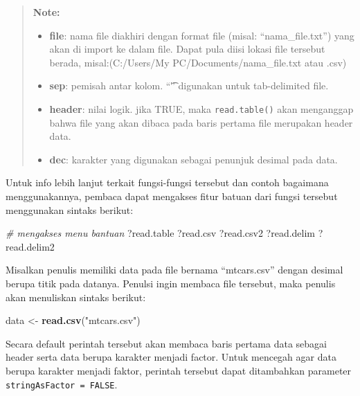 \documentclass[]{book}
\newenvironment{Shaded}{\begin{snugshade}}{\end{snugshade}}
\newcommand{\KeywordTok}[1]{\textcolor[rgb]{0.13,0.29,0.53}{\textbf{#1}}}
\newcommand{\StringTok}[1]{\textcolor[rgb]{0.31,0.60,0.02}{#1}}
\newcommand{\CommentTok}[1]{\textcolor[rgb]{0.56,0.35,0.01}{\textit{#1}}}
\newcommand{\NormalTok}[1]{#1}
\providecommand{\tightlist}{%
  \setlength{\itemsep}{0pt}\setlength{\parskip}{0pt}}
\begin{document}
\begin{quote}
\textbf{Note: }

\begin{itemize}
\tightlist
\item
  \textbf{file}: nama file diakhiri dengan format file (misal:
  ``nama\_file.txt'') yang akan di import ke dalam file. Dapat pula
  diisi lokasi file tersebut berada, misal:(C:/Users/My
  PC/Documents/nama\_file.txt atau .csv)
\item
  \textbf{sep}: pemisah antar kolom. ``\t'' digunakan untuk
  tab-delimited file.
\item
  \textbf{header}: nilai logik. jika TRUE, maka \texttt{read.table()}
  akan menganggap bahwa file yang akan dibaca pada baris pertama file
  merupakan header data.
\item
  \textbf{dec}: karakter yang digunakan sebagai penunjuk desimal pada
  data.
\end{itemize}
\end{quote}

Untuk info lebih lanjut terkait fungsi-fungsi tersebut dan contoh
bagaimana menggunakannya, pembaca dapat mengakses fitur batuan dari
fungsi tersebut menggunakan sintaks berikut:

\begin{Shaded}
\begin{Highlighting}[]
\CommentTok{# mengakses menu bantuan}
\NormalTok{?read.table}
\NormalTok{?read.csv}
\NormalTok{?read.csv2}
\NormalTok{?read.delim}
\NormalTok{?read.delim2}
\end{Highlighting}
\end{Shaded}

Misalkan penulis memiliki data pada file bernama ``mtcars.csv'' dengan
desimal berupa titik pada datanya. Penulsi ingin membaca file tersebut,
maka penulis akan menuliskan sintaks berikut:

\begin{Shaded}
\begin{Highlighting}[]
\NormalTok{data <-}\StringTok{ }\KeywordTok{read.csv}\NormalTok{(}\StringTok{"mtcars.csv"}\NormalTok{)}
\end{Highlighting}
\end{Shaded}

Secara default perintah tersebut akan membaca baris pertama data sebagai
header serta data berupa karakter menjadi factor. Untuk mencegah agar
data berupa karakter menjadi faktor, perintah tersebut dapat ditambahkan
parameter \texttt{stringAsFactor\ =\ FALSE}.
\end{document}
